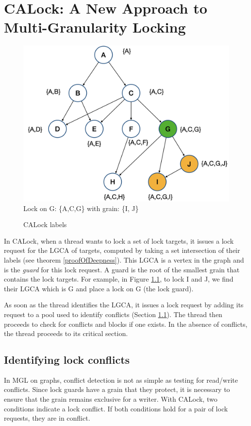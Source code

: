 
\chapter{CALock: A New Approach to Multi-Granularity Locking} \label{chap:calock}
\begin{figure}
	\centering
	\captionsetup{justification=centering}
	\includegraphics[width=.7\columnwidth]{figures/CALockExample}\\
	{\small
		Lock on G: \{A,C,G\} with grain: \{I, J\}
	}
	\caption{CALock labels}
	\label{calockexample}
\end{figure}

In CALock, when a thread wants to lock a set of lock targets, it issues a lock request for the LGCA of targets, computed by taking a set intersection of their labels (see theorem \ref{proofOfDeepness}). 
This LGCA is a vertex in the graph and is the \emph{guard} for this lock request. A guard is the root of the smallest grain that contains the lock targets. For example, in Figure \ref{calockexample}, to lock I and J, we find their LGCA which is G and place a lock on G (the lock guard).

As soon as the thread identifies the LGCA, it issues a lock request by adding its request to a pool used to identify conflicts (Section \ref{lockPool}). 
The thread then proceeds to check for conflicts and blocks if one exists. In the absence of conflicts, the thread proceeds to its critical section.


\section{Identifying lock conflicts} \label{lockPool}
In MGL on graphs, conflict detection is not as simple as testing for read/write conflicts. Since lock guards have a grain that they protect, it is necessary to ensure that the grain remains exclusive for a writer. With CALock, two conditions indicate a lock conflict. If both conditions hold for a pair of lock requests, they are in conflict. 

